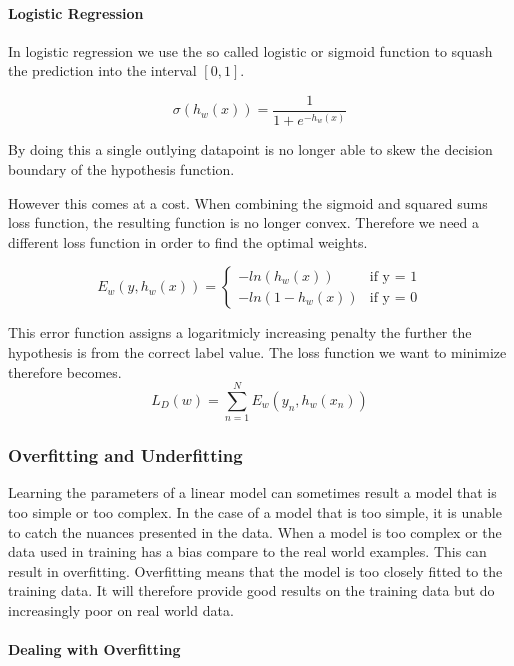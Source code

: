 \paragraph{Logistic Regression}\label{sec:logistic}

In logistic regression we use the so called logistic or sigmoid function to squash the prediction into the interval $[0,1]$.

\[ \sigma(h_w(x)) = \frac{1}{1+e^{-h_w(x)}} \]

By doing this a single outlying datapoint is no longer able to skew the decision boundary of the hypothesis function.

However this comes at a cost.
When combining the sigmoid and squared sums loss function, the resulting function is no longer convex.
Therefore we need a different loss function in order to find the optimal weights.

$$E_w(y,h_w(x)) = \begin{cases}
	-ln(h_w(x)) &\text{if y = 1}\\	
	-ln(1-h_w(x)) &\text{if y = 0}
\end{cases}$$

This error function assigns a logaritmicly increasing penalty the further the hypothesis is from the correct label value.
The loss function we want to minimize therefore becomes. 
$$L_D(w) = \sum_{n=1}^N E_w(y_n, h_w(x_n))$$ 

\subsubsection{Overfitting and Underfitting}
Learning the parameters of a linear model can sometimes result a model that is too simple or too complex.
In the case of a model that is too simple, it is unable to catch the nuances presented in the data.
When a model is too complex or the data used in training has a bias compare to the real world examples.
This can result in overfitting.
Overfitting means that the model is too closely fitted to the training data.
It will therefore provide good results on the training data but do increasingly poor on real world data.

\paragraph{Dealing with Overfitting}

